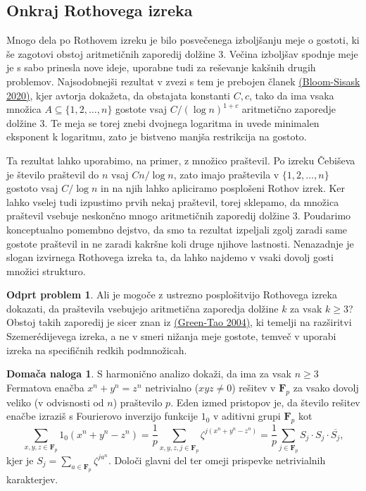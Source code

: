 \documentclass[11pt]{book}
\def\FF{\mathbf{F}}
\theoremstyle{definition}
\theoremstyle{zgled}
\theoremstyle{odprtproblem}
\newtheorem*{odprtproblem}{Odprt problem}
\theoremstyle{domacanaloga}
\newtheorem*{domacanaloga}{Domača naloga}
\theoremstyle{izrek}
\begin{document}
\subsection{Onkraj Rothovega izreka}

Mnogo dela po Rothovem izreku je bilo posvečenega izboljšanju meje o gostoti, ki še zagotovi obstoj aritmetičnih zaporedij dolžine $3$. Večina izboljšav spodnje meje je s sabo prinesla nove ideje, uporabne tudi za reševanje kakšnih drugih problemov. Najsodobnejši rezultat v zvezi s tem je prebojen članek \href{https://www.quantamagazine.org/landmark-math-proof-clears-hurdle-in-top-erdos-conjecture-20200803/}{(Bloom-Sisask 2020)}, kjer avtorja dokažeta, da obstajata konstanti $C,c$, tako da ima vsaka množica $A \subseteq \{ 1, 2, \dots, n \}$ gostote vsaj $C / (\log n)^{1 + c}$ aritmetično zaporedje dolžine $3$. Te meja se torej znebi dvojnega logaritma in uvede minimalen eksponent k logaritmu, zato je bistveno manjša restrikcija na gostoto. 

Ta rezultat lahko uporabimo, na primer, z množico praštevil. Po izreku Čebiševa je število praštevil do $n$ vsaj $C n / \log n$, zato imajo praštevila v $\{1,2,\dots,n\}$ gostoto vsaj $C / \log n$ in na njih lahko apliciramo posplošeni Rothov izrek. Ker lahko vselej tudi izpustimo prvih nekaj praštevil, torej sklepamo, da množica praštevil vsebuje neskončno mnogo aritmetičnih zaporedij dolžine $3$. Poudarimo konceptualno pomembno dejstvo, da smo ta rezultat izpeljali zgolj zaradi same gostote praštevil in ne zaradi kakršne koli druge njihove lastnosti. Nenazadnje je slogan izvirnega Rothovega izreka ta, da lahko najdemo v vsaki dovolj gosti množici strukturo.

\begin{odprtproblem}
Ali je mogoče z ustrezno posplošitvijo Rothovega izreka dokazati, da praštevila vsebujejo aritmetična zaporedja dolžine $k$ za vsak $k \geq 3$? Obstoj takih zaporedij je sicer znan iz \href{https://en.wikipedia.org/wiki/Green–Tao_theorem}{(Green-Tao 2004)}, ki temelji na razširitvi Szemerédijevega izreka, a ne v smeri nižanja meje gostote, temveč v uporabi izreka na specifičnih redkih podmnožicah.
\end{odprtproblem}

\begin{domacanaloga}
S harmonično analizo dokaži, da ima za vsak $n \geq 3$ Fermatova enačba $x^n + y^n = z^n$ netrivialno ($xyz \neq 0$) rešitev v $\FF_p$ za vsako dovolj veliko (v odvisnosti od $n$) praštevilo $p$. Eden izmed pristopov je, da število rešitev enačbe izraziš s Fourierovo inverzijo funkcije $1_0$ v aditivni grupi $\FF_p$ kot
\[
    \sum_{x,y,z \in \FF_p} 1_{0}(x^n + y^n - z^n)
    = \frac{1}{p} \sum_{x, y, z, j \in \FF_p} \zeta^{j(x^n + y^n - z^n)}
    = \frac{1}{p} \sum_{j \in \FF_p} S_j \cdot S_j \cdot \overline{S_j},
\]
kjer je $S_j = \sum_{a \in \FF_p} \zeta^{j a^n}$. Določi glavni del ter omeji prispevke netrivialnih karakterjev.
\end{domacanaloga}
\end{document}

